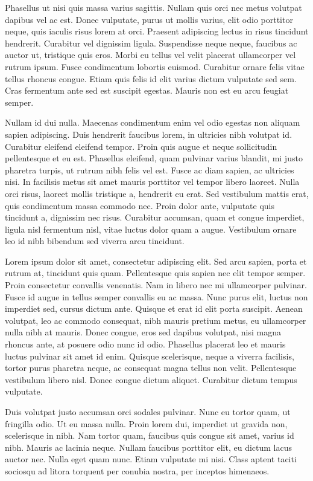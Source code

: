 \documentclass[13pt, letterpaper, twoside]{book}
\begin{document}
Phasellus ut nisi quis massa varius sagittis. Nullam quis orci nec metus volutpat dapibus vel ac est. Donec vulputate, purus ut mollis varius, elit odio porttitor neque, quis iaculis risus lorem at orci. Praesent adipiscing lectus in risus tincidunt hendrerit. Curabitur vel dignissim ligula. Suspendisse neque neque, faucibus ac auctor ut, tristique quis eros. Morbi eu tellus vel velit placerat ullamcorper vel rutrum ipsum. Fusce condimentum lobortis euismod. Curabitur ornare felis vitae tellus rhoncus congue. Etiam quis felis id elit varius dictum vulputate sed sem. Cras fermentum ante sed est suscipit egestas. Mauris non est eu arcu feugiat semper.

Nullam id dui nulla. Maecenas condimentum enim vel odio egestas non aliquam sapien adipiscing. Duis hendrerit faucibus lorem, in ultricies nibh volutpat id. Curabitur eleifend eleifend tempor. Proin quis augue et neque sollicitudin pellentesque et eu est. Phasellus eleifend, quam pulvinar varius blandit, mi justo pharetra turpis, ut rutrum nibh felis vel est. Fusce ac diam sapien, ac ultricies nisi. In facilisis metus sit amet mauris porttitor vel tempor libero laoreet. Nulla orci risus, laoreet mollis tristique a, hendrerit eu erat. Sed vestibulum mattis erat, quis condimentum massa commodo nec. Proin dolor ante, vulputate quis tincidunt a, dignissim nec risus. Curabitur accumsan, quam et congue imperdiet, ligula nisl fermentum nisl, vitae luctus dolor quam a augue. Vestibulum ornare leo id nibh bibendum sed viverra arcu tincidunt. 



Lorem ipsum dolor sit amet, consectetur adipiscing elit. Sed arcu sapien, porta et rutrum at, tincidunt quis quam. Pellentesque quis sapien nec elit tempor semper. Proin consectetur convallis venenatis. Nam in libero nec mi ullamcorper pulvinar. Fusce id augue in tellus semper convallis eu ac massa. Nunc purus elit, luctus non imperdiet sed, cursus dictum ante. Quisque et erat id elit porta suscipit. Aenean volutpat, leo ac commodo consequat, nibh mauris pretium metus, eu ullamcorper nulla nibh at mauris. Donec congue, eros sed dapibus volutpat, nisi magna rhoncus ante, at posuere odio nunc id odio. Phasellus placerat leo et mauris luctus pulvinar sit amet id enim. Quisque scelerisque, neque a viverra facilisis, tortor purus pharetra neque, ac consequat magna tellus non velit. Pellentesque vestibulum libero nisl. Donec congue dictum aliquet. Curabitur dictum tempus vulputate.

Duis volutpat justo accumsan orci sodales pulvinar. Nunc eu tortor quam, ut fringilla odio. Ut eu massa nulla. Proin lorem dui, imperdiet ut gravida non, scelerisque in nibh. Nam tortor quam, faucibus quis congue sit amet, varius id nibh. Mauris ac lacinia neque. Nullam faucibus porttitor elit, eu dictum lacus auctor nec. Nulla eget quam nunc. Etiam vulputate mi nisi. Class aptent taciti sociosqu ad litora torquent per conubia nostra, per inceptos himenaeos.
\end{document}
